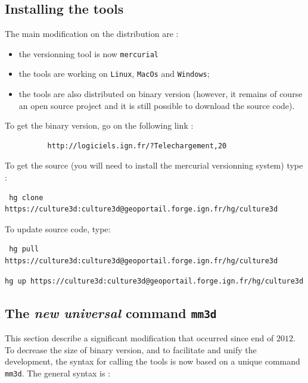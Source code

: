 \subsection{Installing the tools}
\label{Install}

The main modification on the distribution are :

\begin{itemize}
   \item  the versionning tool is now {\tt mercurial}
   \item  the tools are working on {\tt Linux}, {\tt MacOs} and  {\tt Windows};
   \item  the tools are also distributed on binary  version (however, it  remains of course
          an open source project and it is still possible to download the source code).
\end{itemize}

To get the binary version, go on the following link :

\begin{verbatim}
          http://logiciels.ign.fr/?Telechargement,20
\end{verbatim}

To get the source (you will need to install the mercurial versionning system) type :

\begin{verbatim}
 hg clone https://culture3d:culture3d@geoportail.forge.ign.fr/hg/culture3d
\end{verbatim}

To update source code, type:

\begin{verbatim}
 hg pull https://culture3d:culture3d@geoportail.forge.ign.fr/hg/culture3d
\end{verbatim}

\begin{verbatim}
hg up https://culture3d:culture3d@geoportail.forge.ign.fr/hg/culture3d
\end{verbatim}

\subsection{The \emph{new universal} command {\tt mm3d}}

This section describe a significant modification that occurred since end of $2012$. To decrease the
size of binary version, and to facilitate and unify the development, the syntax for calling the tools is now
based on a unique command {\tt mm3d}. The general syntax is :

